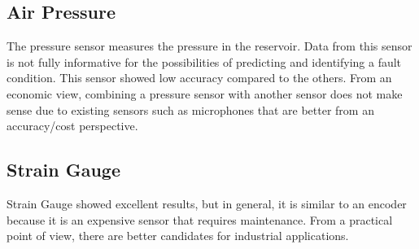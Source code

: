 \subsection{Air Pressure}
The pressure sensor measures the pressure in the reservoir. Data from this
sensor is not fully informative for the possibilities of predicting and
identifying a fault condition. This sensor showed low accuracy compared to
the others. From an economic view, combining a pressure sensor with another
sensor does not make sense due to existing sensors such as microphones that
are better from an accuracy/cost perspective.

\subsection{Strain Gauge}
Strain Gauge showed excellent results, but in general, it is similar to an
encoder because it is an expensive sensor that requires maintenance.  From
a practical point of view, there are better candidates for industrial
applications.
